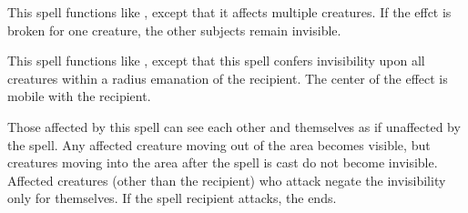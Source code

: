 \begin{spelleffect}
    This spell functions like , except that it affects multiple creatures. If the effct is broken for one creature, the other subjects remain invisible.
\end{spelleffect}

\begin{spelleffect}
    This spell functions like , except that this spell confers invisibility upon all creatures within a \areasmall radius emanation of the recipient. The center of the effect is mobile with the recipient.
    \par Those affected by this spell can see each other and themselves as if unaffected by the spell. Any affected creature moving out of the area becomes visible, but creatures moving into the area after the spell is cast do not become invisible. Affected creatures (other than the recipient) who attack negate the invisibility only for themselves. If the spell recipient attacks, the  ends.
\end{spelleffect}

